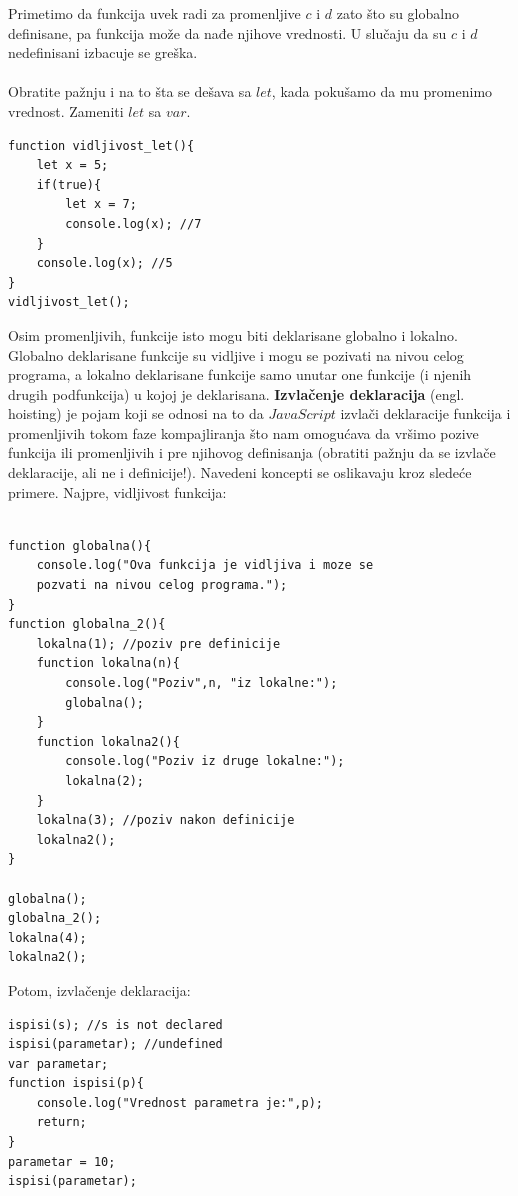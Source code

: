 \documentclass[a4paper]{article}
\begin{document}
Primetimo da funkcija uvek radi za promenljive $c$ i $d$ zato što su globalno definisane, pa funkcija može da nađe njihove vrednosti. U slučaju da su $c$ i $d$ nedefinisani izbacuje se greška.\\\\
Obratite pažnju i na to šta se dešava sa $let$, kada pokušamo da mu promenimo vrednost. Zameniti $let$ sa $var$.
\begin{lstlisting}[backgroundcolor = \color{lightgray}]
function vidljivost_let(){
	let x = 5;
	if(true){
		let x = 7;
		console.log(x); //7
	} 
	console.log(x); //5
}
vidljivost_let();
\end{lstlisting}

Osim promenljivih, funkcije isto mogu biti deklarisane globalno i lokalno. Globalno deklarisane funkcije su vidljive i mogu se pozivati na nivou celog programa, a lokalno deklarisane funkcije samo unutar one funkcije (i njenih drugih podfunkcija) u kojoj je deklarisana. \textbf{Izvlačenje deklaracija} (engl. hoisting) je pojam koji se odnosi na to da $JavaScript$ izvlači deklaracije funkcija i promenljivih tokom faze kompajliranja što nam omogućava da vršimo pozive funkcija ili promenljivih i pre njihovog definisanja (obratiti pažnju da se izvlače deklaracije, ali ne i definicije!). Navedeni koncepti se oslikavaju kroz sledeće primere. Najpre, vidljivost funkcija:

\begin{lstlisting}[backgroundcolor = \color{lightgray}]

function globalna(){
	console.log("Ova funkcija je vidljiva i moze se 
	pozvati na nivou celog programa.");
}
function globalna_2(){
	lokalna(1); //poziv pre definicije
	function lokalna(n){
		console.log("Poziv",n, "iz lokalne:");
		globalna();
	}
	function lokalna2(){
		console.log("Poziv iz druge lokalne:");
		lokalna(2);
	}
    lokalna(3); //poziv nakon definicije   
    lokalna2();
}

globalna();
globalna_2();
lokalna(4);
lokalna2();
\end{lstlisting}
Potom, izvlačenje deklaracija:
\begin{lstlisting}[backgroundcolor = \color{lightgray}]
ispisi(s); //s is not declared
ispisi(parametar); //undefined
var parametar;
function ispisi(p){
	console.log("Vrednost parametra je:",p);
    return;
}
parametar = 10; 
ispisi(parametar);
\end{lstlisting}
\end{document}
